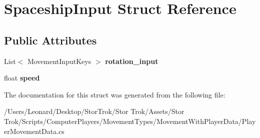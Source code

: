 \hypertarget{struct_spaceship_input}{}\section{Spaceship\+Input Struct Reference}
\label{struct_spaceship_input}
\subsection*{Public Attributes}
\begin{DoxyCompactItemize}
\item 
\mbox{\label{struct_spaceship_input_a49db714cfcd6245dc4a23b07df26186d}} 
List$<$ Movement\+Input\+Keys $>$ {\bfseries rotation\+\_\+input}
\item 
\mbox{\label{struct_spaceship_input_abc701d2d5ca26434a2cd34166f719872}} 
float {\bfseries speed}
\end{DoxyCompactItemize}


The documentation for this struct was generated from the following file\+:\begin{DoxyCompactItemize}
\item 
/\+Users/\+Leonard/\+Desktop/\+Stor\+Trok/\+Stor Trok/\+Assets/\+Stor Trok/\+Scripts/\+Computer\+Players/\+Movement\+Types/\+Movement\+With\+Player\+Data/Player\+Movement\+Data.\+cs\end{DoxyCompactItemize}
